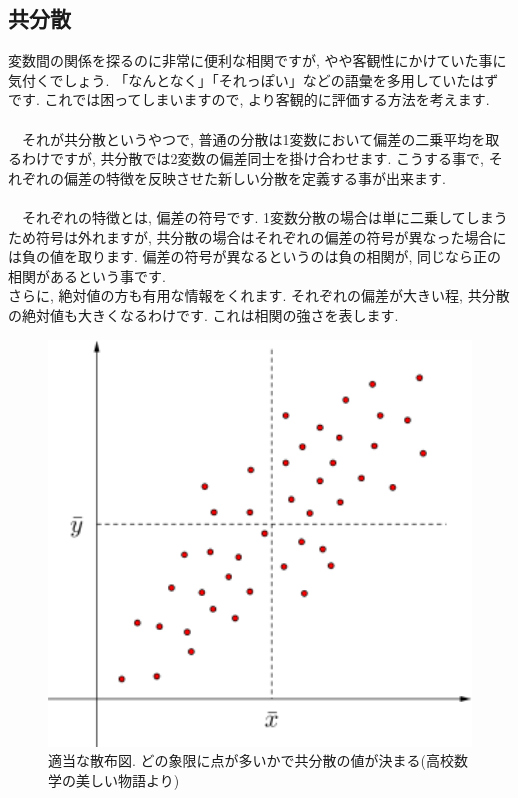\documentclass[11pt,a4paper,uplatex]{ujreport}
\begin{document}
\subsection{共分散}
変数間の関係を探るのに非常に便利な相関ですが, やや客観性にかけていた事に気付くでしょう. 「なんとなく」「それっぽい」などの語彙を多用していたはずです. これでは困ってしまいますので, より客観的に評価する方法を考えます.\\
\\
　それが共分散というやつで, 普通の分散は1変数において偏差の二乗平均を取るわけですが, 共分散では2変数の偏差同士を掛け合わせます. こうする事で, それぞれの偏差の特徴を反映させた新しい分散を定義する事が出来ます. \\
\\
　それぞれの特徴とは, 偏差の符号です. 1変数分散の場合は単に二乗してしまうため符号は外れますが, 共分散の場合はそれぞれの偏差の符号が異なった場合には負の値を取ります. 偏差の符号が異なるというのは負の相関が, 同じなら正の相関があるという事です.\\
さらに, 絶対値の方も有用な情報をくれます. それぞれの偏差が大きい程, 共分散の絶対値も大きくなるわけです. これは相関の強さを表します.\\

\begin{figure}[H]
\label{im:co-var}
  \centering
  \includegraphics[width=120mm,bb=0 0 432 288]{../figures/kyoubunnsann.png}
  \caption{適当な散布図. どの象限に点が多いかで共分散の値が決まる(高校数学の美しい物語より)}
\end{figure}
\end{document}
